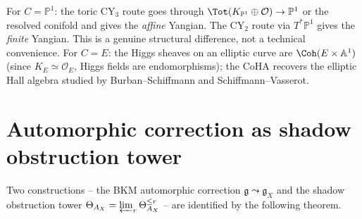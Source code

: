 \begin{remark}
\label{rem:thy-higgs-cy2-vs-cy3}
For $C=\mathbb{P}^1$: the toric $\mathrm{CY}_3$ route goes through
$\Tot(K_{\mathbb{P}^1}\oplus\mathcal{O})\to\mathbb{P}^1$ or the resolved
conifold and gives the \emph{affine} Yangian. The $\mathrm{CY}_2$ route via
$T^*\mathbb{P}^1$ gives the \emph{finite} Yangian. This is a genuine
structural difference, not a technical convenience. For $C=E$: the Higgs
sheaves on an elliptic curve are $\Coh(E\times\mathbb{A}^1)$ (since
$K_E\simeq\mathcal{O}_E$, Higgs fields are endomorphisms); the CoHA recovers
the elliptic Hall algebra studied by Burban--Schiffmann and Schiffmann--Vasserot.
\end{remark}

\section{Automorphic correction as shadow obstruction tower}
\label{sec:thy-autshadow-main}

Two constructions -- the BKM automorphic correction $\mathfrak{g}\leadsto\mathfrak{g}_X$
and the shadow obstruction tower $\Theta_{A_X}=\varprojlim_r\Theta^{\leq r}_{A_X}$
-- are identified by the following theorem.

